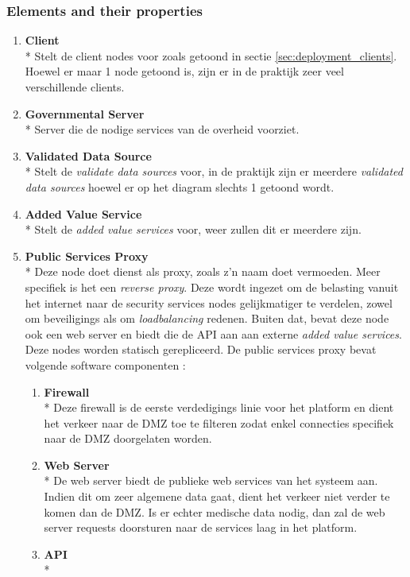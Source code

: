 \documentclass[a4paper,10pt]{article}
\begin{document}
\subsubsection{Elements and their properties}
\begin{enumerate}
 \item \textbf{Client}\\*
Stelt de client nodes voor zoals getoond in sectie \ref{sec:deployment_clients}. Hoewel er maar 1 node getoond is, zijn er in de praktijk zeer veel verschillende clients.
\item \textbf{Governmental Server}\\*
Server die de nodige services van de overheid voorziet.
\item \textbf{Validated Data Source}\\*
Stelt de \textit{validate data sources} voor, in de praktijk zijn er meerdere \textit{validated data sources} hoewel er op het diagram slechts 1 getoond wordt.
\item \textbf{Added Value Service}\\*
Stelt de \textit{added value services} voor, weer zullen dit er meerdere zijn.
\item \textbf{Public Services Proxy}\\*
Deze node doet dienst als proxy, zoals z'n naam doet vermoeden. Meer specifiek is het een \textit{reverse proxy}. Deze wordt ingezet om de belasting vanuit het internet naar de security services nodes gelijkmatiger te verdelen, zowel om beveiligings als om \textit{loadbalancing} redenen. Buiten dat, bevat deze node ook een web server en biedt die de API aan aan externe \textit{added value services}. Deze nodes worden statisch gerepliceerd. De public services proxy bevat volgende software componenten : 
\begin{enumerate}
 \item \textbf{Firewall}\\*
 Deze firewall is de eerste verdedigings linie voor het platform en dient het verkeer naar de DMZ toe te filteren zodat enkel connecties specifiek naar de DMZ doorgelaten worden.
\item \textbf{Web Server}\\*
De web server biedt de publieke web services van het systeem aan. Indien dit om zeer algemene data gaat, dient het verkeer niet verder te komen dan de DMZ. Is er echter medische data nodig, dan zal de web server requests doorsturen naar de services laag in het platform.
\item \textbf{API}\\*

\end{enumerate}
\end{enumerate}
\end{document}
